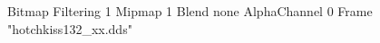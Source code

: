 {Bitmap
	{Filtering 1}
	{Mipmap 1}
	{Blend none}
	{AlphaChannel 0}
	{Frame "hotchkiss132_xx.dds"}
}
